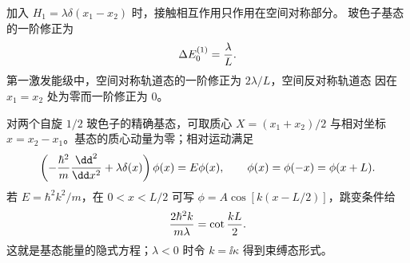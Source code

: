 \begin{question}
\begin{solution}
加入 $H_1=\lambda\delta(x_1-x_2)$ 时，接触相互作用只作用在空间对称部分。
玻色子基态的一阶修正为
\[
  \Delta E_0^{(1)}={\lambda\over L}.
\]
第一激发能级中，空间对称轨道态的一阶修正为 $2\lambda/L$，空间反对称轨道态
因在 $x_1=x_2$ 处为零而一阶修正为 $0$。

对两个自旋 $1/2$ 玻色子的精确基态，可取质心 $X=(x_1+x_2)/2$ 与相对坐标
$x=x_2-x_1$。基态的质心动量为零；相对运动满足
\[
  \left(-{\hbar^2\over m}{\dd^2\over\dd x^2}+\lambda\delta(x)\right)\phi(x)=E\phi(x),
  \qquad \phi(x)=\phi(-x)=\phi(x+L).
\]
若 $E=\hbar^2k^2/m$，在 $0<x<L/2$ 可写
$\phi=A\cos[k(x-L/2)]$，跳变条件给
\[
  {2\hbar^2k\over m\lambda}=\cot{kL\over2}.
\]
这就是基态能量的隐式方程；$\lambda<0$ 时令 $k=\ii\kappa$ 得到束缚态形式。
\end{solution}
\end{question}
